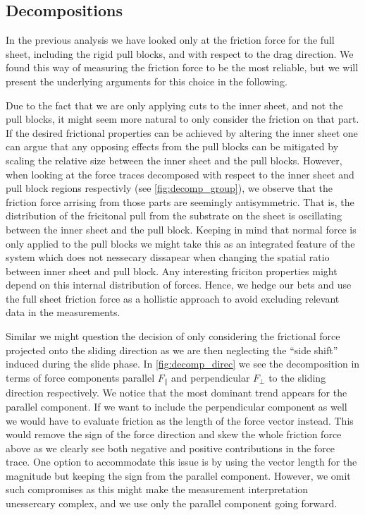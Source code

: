 \subsection{Decompositions}
In the previous analysis we have looked only at the friction force for the full
sheet, including the rigid pull blocks, and with
respect to the drag direction. We found this way of measuring the friction force to be the most reliable, but we will present the underlying arguments for this choice in the following.

Due to the fact that we are only applying cuts to the inner sheet, and not the
pull blocks, it might seem more natural to only consider the friction on that
part. If the desired frictional properties can be achieved by altering the inner
sheet one can argue that any opposing effects from the pull blocks can be
mitigated by scaling the relative size between the inner sheet and the pull
blocks. However, when looking at the force traces decomposed with respect to the
inner sheet and pull block regions respectivly (see \cref{fig:decomp_group}), we
observe that the friction force arrising from those parts are seemingly
antisymmetric. That is, the distribution of the fricitonal pull from the
substrate on the sheet is oscillating between the inner sheet and the pull
block. Keeping in mind that normal force is only applied to the pull blocks we
might take this as an integrated feature of the system which does not nessecary
dissapear when changing the spatial ratio between inner sheet and pull block.
Any interesting friciton properties might depend on this internal distribution
of forces. Hence, we hedge our bets and use the full sheet friction force as a
hollistic approach to avoid excluding relevant data in the measurements.

Similar we might question the decision of
only considering the frictional force projected onto the sliding direction as
we are then neglecting the ``side shift'' induced during the slide phase. In \cref{fig:decomp_direc} we see the decomposition in terms of force components parallel $F_{\parallel}$ and perpendicular $F_{\perp}$ to the sliding direction respectively. We notice that the most dominant trend appears for the parallel component. If we want to include the perpendicular component as well we would have to evaluate friction as the length of the force vector instead. This would remove the sign of the force direction and skew the whole friction force above as we clearly see both negative and positive contributions in the force trace. One option to accommodate this issue is by using the vector length for the magnitude but keeping the sign from the parallel component. However, we omit such compromises as this might make the measurement interpretation unessercary complex, and we use only the parallel component going forward. 

